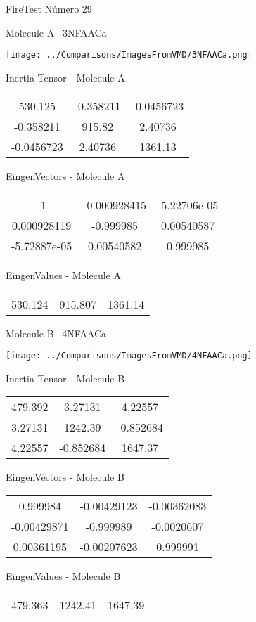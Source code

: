\vtab[-3cm]
\begin{center}
{\large FireTest \tab Número 29}
\end{center}
\begin{multicols}{2}
\begin{center}

Molecule A \
3NFAACa

\texttt{[image: ../Comparisons/ImagesFromVMD/3NFAACa.png]}

Inertia Tensor - Molecule A \\
\begin{tabular}{|c c c|}
530.125	 & 	-0.358211	 & 	-0.0456723	 \\
-0.358211	 & 	915.82	 & 	2.40736	 \\
-0.0456723	 & 	2.40736	 & 	1361.13
\end{tabular}

\vtab
 EingenVectors - Molecule A     \\
\begin{tabular}{|c c c|}
-1	 & 	-0.000928415	 & 	-5.22706e-05	 \\
0.000928119	 & 	-0.999985	 & 	0.00540587	 \\
-5.72887e-05	 & 	0.00540582	 & 	0.999985
\end{tabular}

\vtab
 EingenValues - Molecule A     \\
\begin{tabular}{|c c c|}
530.124	 & 	915.807	 & 	1361.14	 \\
\end{tabular}
\columnbreak

Molecule B \
4NFAACa

\texttt{[image: ../Comparisons/ImagesFromVMD/4NFAACa.png]}

Inertia Tensor - Molecule B \\
\begin{tabular}{|c c c|}
479.392	 & 	3.27131	 & 	4.22557	 \\
3.27131	 & 	1242.39	 & 	-0.852684	 \\
4.22557	 & 	-0.852684	 & 	1647.37
\end{tabular}

\vtab
 EingenVectors - Molecule B     \\
\begin{tabular}{|c c c|}
0.999984	 & 	-0.00429123	 & 	-0.00362083	 \\
-0.00429871	 & 	-0.999989	 & 	-0.0020607	 \\
0.00361195	 & 	-0.00207623	 & 	0.999991
\end{tabular}

\vtab
 EingenValues - Molecule B     \\
\begin{tabular}{|c c c|}
479.363	 & 	1242.41	 & 	1647.39	 \\
\end{tabular}

\end{center}
\end{multicols}

